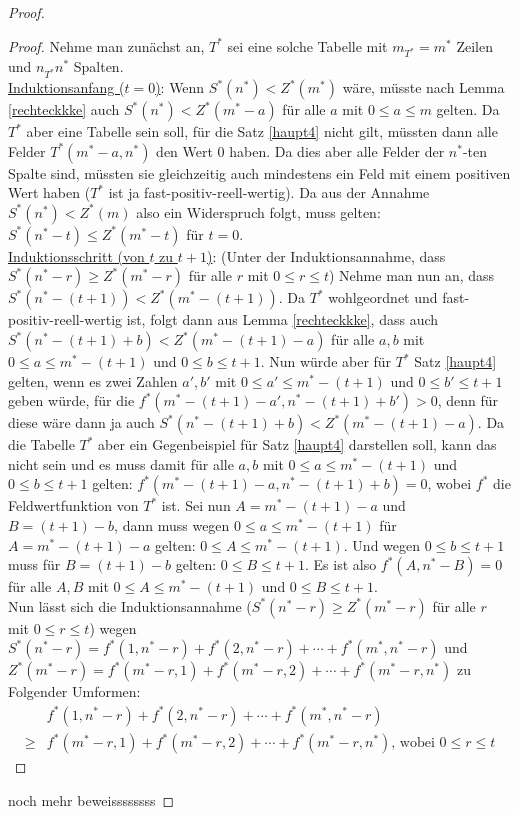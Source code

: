 \begin{proof}
\begin{lem}
    \end{lem}
    \begin{proof}
        Nehme man zunächst an, $T^*$ sei eine solche Tabelle mit $m_{T^*}=m^*$ Zeilen und $n_{T^*}n^*$ Spalten.\\
        \underline{Induktionsanfang ($t=0$)}: Wenn $S^*(n^*) < Z^*(m^*)$ wäre, müsste nach Lemma \ref{rechteckkke} 
        auch $S^*(n^*) < Z^*(m^*-a)$ für alle $a$ mit $0 \leq a \leq m$ gelten. Da $T^*$ aber eine Tabelle 
        sein soll, für die Satz \ref{haupt4} nicht gilt, müssten dann alle Felder $T^*(m^*-a, n^*)$ den Wert 0 haben. 
        Da dies aber alle Felder der $n^*$-ten Spalte sind, müssten sie gleichzeitig auch mindestens ein Feld 
        mit einem positiven Wert haben ($T^*$ ist ja fast-positiv-reell-wertig). Da aus der Annahme $S^*(n^*) < Z^*(m)$ 
        also ein Widerspruch folgt, muss gelten: $S^*(n^*-t) \leq Z^*(m^*-t)$ für $t=0$.\\
        \underline{Induktionsschritt (von $t$ zu $t+1$)}: (Unter der Induktionsannahme, dass $S^*(n^*-r) \geq 
        Z^*(m^*-r)$ für alle $r$ mit $0 \leq r \leq t$) Nehme man nun an, dass $S^*(n^*-(t+1)) < Z^*(m^*-(t+1))$. 
        Da $T^*$ wohlgeordnet und fast-positiv-reell-wertig ist, folgt dann aus Lemma \ref{rechteckkke}, 
        dass auch $S^*(n^*-(t+1)+b) < Z^*(m^*-(t+1)-a)$ für alle $a, b$ mit $0\leq a\leq m^*-(t+1)$ und 
        $0\leq b\leq t+1$. Nun würde aber für $T^*$ Satz \ref{haupt4} gelten, wenn es zwei Zahlen $a', b'$ mit 
        $0\leq a'\leq m^*-(t+1)$ und $0\leq b'\leq t+1$ geben würde, für die $f^*(m^*-(t+1)-a', n^*-(t+1)+b') >0$, 
        denn für diese wäre dann ja auch $S^*(n^*-(t+1)+b) < Z^*(m^*-(t+1)-a)$. Da die Tabelle $T^*$ aber ein 
        Gegenbeispiel für Satz \ref{haupt4} darstellen soll, kann das nicht sein und es muss damit für alle $a, b$ 
        mit $0\leq a\leq m^*-(t+1)$ und $0\leq b\leq t+1$ gelten: $f^*(m^*-(t+1)-a, n^*-(t+1)+b)=0$, wobei $f^*$ die 
        Feldwertfunktion von $T^*$ ist. Sei nun $A=m^*-(t+1)-a$ und $B=(t+1)-b$, dann muss wegen $0\leq a\leq m^*-(t+1)$ 
        für $A=m^*-(t+1)-a$ gelten: $0\leq A\leq m^*-(t+1)$. Und wegen $0\leq b\leq t+1$ muss für $B=(t+1)-b$ gelten: 
        $0 \leq B\leq t+1$. Es ist also $f^*(A, n^*-B) =0$ für alle $A,B$ mit $0\leq A\leq m^*-(t+1)$ und $0 \leq B
        \leq t+1$.\\
        Nun lässt sich die Induktionsannahme ($S^*(n^*-r) \geq Z^*(m^*-r)$ für alle $r$ mit $0 \leq r \leq t$) wegen 
        $S^*(n^*-r)=f^*(1,n^*-r) + f^*(2,n^*-r)+\cdots +f^*(m^*,n^*-r)$ und $Z^*(m^*-r)=f^*(m^*-r, 1) + f^*(m^*-r, 2) 
        + \cdots + f^*(m^*-r, n^*)$ zu Folgender Umformen:
        \begin{align*}
            &f^*(1,n^*-r)+f^*(2,n^*-r)+\cdots+f^*(m^*,n^*-r)\\ 
            \geq &f^*(m^*-r, 1)+f^*(m^*-r, 2)+\cdots +f^*(m^*-r, n^*)\text{, wobei $0 \leq r \leq t$}
        \end{align*}

    \end{proof}
    noch mehr beweissssssss
    \renewcommand{\qedsymbol}{$\blacksquare$}
\end{proof}
